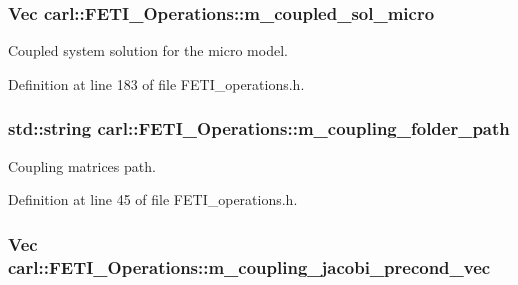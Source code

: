 \subsubsection[{m\+\_\+coupled\+\_\+sol\+\_\+micro}]{\setlength{\rightskip}{0pt plus 5cm}Vec carl\+::\+F\+E\+T\+I\+\_\+\+Operations\+::m\+\_\+coupled\+\_\+sol\+\_\+micro\hspace{0.3cm}{\ttfamily [protected]}}\label{classcarl_1_1_f_e_t_i___operations_ad1760c083bd94bd64b0137098fe59fa8}


Coupled system solution for the micro model. 



Definition at line 183 of file F\+E\+T\+I\+\_\+operations.\+h.

\hypertarget{classcarl_1_1_f_e_t_i___operations_a2eee572375e0b5aab15f31fb55f2e48f}{}
\subsubsection[{m\+\_\+coupling\+\_\+folder\+\_\+path}]{\setlength{\rightskip}{0pt plus 5cm}std\+::string carl\+::\+F\+E\+T\+I\+\_\+\+Operations\+::m\+\_\+coupling\+\_\+folder\+\_\+path\hspace{0.3cm}{\ttfamily [protected]}}\label{classcarl_1_1_f_e_t_i___operations_a2eee572375e0b5aab15f31fb55f2e48f}


Coupling matrices path. 



Definition at line 45 of file F\+E\+T\+I\+\_\+operations.\+h.

\hypertarget{classcarl_1_1_f_e_t_i___operations_a1d88407c07e4b6a4802e2f4e49015b32}{}
\subsubsection[{m\+\_\+coupling\+\_\+jacobi\+\_\+precond\+\_\+vec}]{\setlength{\rightskip}{0pt plus 5cm}Vec carl\+::\+F\+E\+T\+I\+\_\+\+Operations\+::m\+\_\+coupling\+\_\+jacobi\+\_\+precond\+\_\+vec\hspace{0.3cm}{\ttfamily [protected]}}\label{classcarl_1_1_f_e_t_i___operations_a1d88407c07e4b6a4802e2f4e49015b32}


